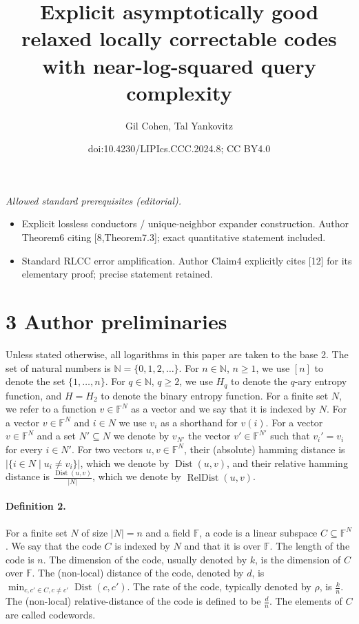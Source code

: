 \documentclass[10pt,a4paper]{article}
\title{Explicit asymptotically good relaxed locally correctable codes with near-log-squared query complexity}
\author{Gil Cohen, Tal Yankovitz}
\date{doi:10.4230/LIPIcs.CCC.2024.8; CC BY4.0}
\begin{document}
\maketitle
\noindent\textit{Allowed standard prerequisites (editorial).}\begin{itemize}
\item Explicit lossless conductors / unique-neighbor expander construction. Author Theorem6 citing [8,Theorem7.3]; exact quantitative statement included.
\item Standard RLCC error amplification. Author Claim4 explicitly cites [12] for its elementary proof; precise statement retained.
\end{itemize}\medskip
\section*{3 Author preliminaries}
Unless stated otherwise, all logarithms in this paper are taken to the base 2. The set of natural numbers is $\mathbb N=\{0,1,2,\ldots\}$. For $n\in\mathbb N$, $n\ge1$, we use $[n]$ to denote the set $\{1,\ldots,n\}$. For $q\in\mathbb N$, $q\ge2$, we use $H_q$ to denote the $q$-ary entropy function, and $H=H_2$ to denote the binary entropy function.
For a finite set $N$, we refer to a function $v\in\mathbb F^N$ as a vector and we say that it is indexed by $N$. For a vector $v\in\mathbb F^N$ and $i\in N$ we use $v_i$ as a shorthand for $v(i)$. For a vector $v\in\mathbb F^N$ and a set $N'\subseteq N$ we denote by $v_{N'}$ the vector $v'\in\mathbb F^{N'}$ such that $v_i'=v_i$ for every $i\in N'$. For two vectors $u,v\in\mathbb F^N$, their (absolute) hamming distance is $|\{i\in N\mid u_i\ne v_i\}|$, which we denote by $\operatorname{Dist}(u,v)$, and their relative hamming distance is $\frac{\operatorname{Dist}(u,v)}{|N|}$, which we denote by $\operatorname{RelDist}(u,v)$.
\paragraph{Definition 2.} For a finite set $N$ of size $|N|=n$ and a field $\mathbb F$, a code is a linear subspace $C\subseteq\mathbb F^N$. We say that the code $C$ is indexed by $N$ and that it is over $\mathbb F$. The length of the code is $n$. The dimension of the code, usually denoted by $k$, is the dimension of $C$ over $\mathbb F$. The (non-local) distance of the code, denoted by $d$, is $\min_{c,c'\in C,c\ne c'}\operatorname{Dist}(c,c')$. The rate of the code, typically denoted by $\rho$, is $\frac kn$. The (non-local) relative-distance of the code is defined to be $\frac dn$. The elements of $C$ are called codewords.
\end{document}
